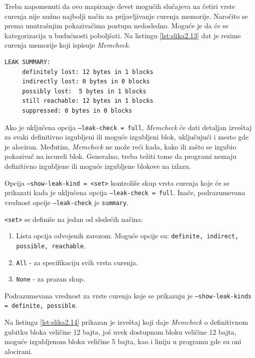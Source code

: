 \documentclass[12pt,oneside]{memoir}
\theoremstyle{plain}
\theoremstyle{definition}
\begin{document}
Treba napomenuti da ovo mapiranje devet mogućih slučajeva na četiri vrste curenja nije nužno najbolji način za prijavljivanje curenja memorije. Naročito se prema unutrašnjim pokazivačima postupa nedosledno. Moguće je da će se kategorizacija u budućnosti poboljšati. Na listingu  \ref{lst:slika2.13} dat je rezime curenja memorije koji ispisuje \textit{Memcheck}.


\begin{lstlisting}[style=terminal,caption={Rezime curenja memorije}, label={lst:slika2.13},language={bash}] 
LEAK SUMMARY: 
     definitely lost: 12 bytes in 1 blocks 
     indirectly lost: 0 bytes in 0 blocks
     possibly lost:  5 bytes in 1 blocks 
     still reachable: 12 bytes in 1 blocks
     suppressed: 0 bytes in 0 blocks
\end{lstlisting}

Ako je uključena opcija \texttt{--leak-check = full}, \textit{Memcheck} će dati detaljan izveštaj za svaki definitivno izgubljeni ili moguće izgubljeni blok, uključujući i mesto gde je alociran. Međutim, \textit{Memcheck} ne može reći kada, kako ili zašto se izgubio pokazivač na iscureli blok. Generalno, treba težiti tome da programi nemaju definitivno izgubljene ili moguće izgubljene blokove na izlazu.

Opcija \texttt{--show-leak-kind = <set>} kontroliše skup vrsta curenja koje će se prikazati kada je uključena opcija \texttt{--leak-check = full}. Inače, podrazumevana vrednost opcije \texttt{–leak-check} je \texttt{summary}.

\texttt{<set>} se definiše na jedan od sledećih načina:
\begin{enumerate}
\item Lista opcija odvojenih zarezom. Moguće opcije su: \texttt{definite, indirect, possible, reachable}.
\item \texttt{All} - za specifikaciju svih vrsta curenja.
\item \texttt{None} -  za prazan skup.
\end{enumerate}
Podrazumevana vrednost za vrste curenja koje se prikazuju je \texttt{--show-leak-kinds = definite, possible}.

Na listingu \ref{lst:slika2.14} prikazan je izveštaj koji daje \textit{Memcheck} o definitivnom gubitku bloka veličine 12 bajta, još uvek dostupnom bloku veličine 12 bajta, moguće izgubljenom bloku veličine 5 bajta, kao i liniju u programu gde su oni alocirani. 
\end{document}
